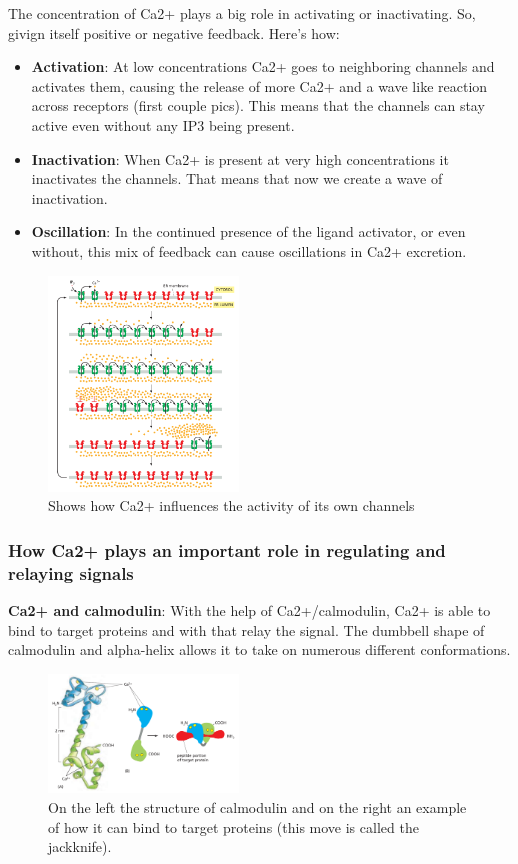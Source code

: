 \documentclass[../main.tex]{subfiles}
\begin{document}
The concentration of Ca2+ plays a big role in activating or inactivating. So, givign itself positive or negative feedback. Here's how:
\begin{itemize}
	\item \textbf{Activation}: At low concentrations Ca2+ goes to neighboring channels and activates them, causing the release of more Ca2+ and a wave like reaction across receptors (first couple pics). This means that the channels can stay active even without any IP3 being present.
	\item \textbf{Inactivation}: When Ca2+ is present at very high concentrations it inactivates the channels. That means that now we create a wave of inactivation.
	\item \textbf{Oscillation}: In the continued presence of the ligand activator, or even without, this mix of feedback can cause oscillations in Ca2+ excretion.
\end{itemize}
\begin{figure}[H]
	\centering
	\includegraphics[width=0.45\textwidth]{Ca2_waves}
	\caption{Shows how Ca2+ influences the activity of its own channels}
\end{figure}

\subsubsection{How Ca2+ plays an important role in regulating and relaying signals}

\textbf{Ca2+ and calmodulin}: With the help of Ca2+/calmodulin, Ca2+ is able to bind to target proteins and with that relay the signal. The dumbbell shape of calmodulin and alpha-helix allows it to take on numerous different conformations.
\begin{figure}[H]
	\centering
	\includegraphics[width=0.45\textwidth]{Ca2_cal}
	\caption{On the left the structure of calmodulin and on the right an example of how it can bind to target proteins (this move is called the jackknife).}
\end{figure}
\end{document}
